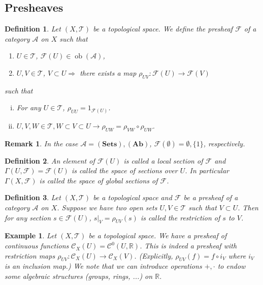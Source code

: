 \documentclass{article}
\newtheorem{definition}{Definition}[section]
\newtheorem{remark}{Remark}[section]
\newtheorem{example}{Example}[section]
\numberwithin{equation}{section}
\DeclareMathOperator{\ob}{ob}
\begin{document}
\subsection{Presheaves}

\begin{definition}
Let $(X,\mathcal{T})$ be a topological space. We define the presheaf $\mathcal{F}$ of a category $\mathcal{A}$ on $X$ such that 
\begin{enumerate}[\textbullet]
\item $U\in\mathcal{T}$, $\mathcal{F}(U)\in\ob(\mathcal{A})$,
\item $U,V\in\mathcal{T}$, $V\subset U \Rightarrow $ there exists a map $\rho_{UV}:\mathcal{F}(U)\to\mathcal{F}(V)$ 
\end{enumerate}

such that 
\begin{enumerate}[i).]
\item For any $U\in\mathcal{T}$, $\rho_{UU}=1_{\mathcal{F}(U)}$.
\item $U,V,W\in\mathcal{T}, W\subset V\subset U\rightarrow \rho_{UW}=\rho_{VW}\circ\rho_{UW}$.
\end{enumerate}
\end{definition}

\begin{remark}
In the case $\mathcal{A} = (\mathbf{Sets}),(\mathbf{Ab})$, $\mathcal{F}(\emptyset)=\emptyset,\{1\}$, respectively.
\end{remark}

\begin{definition}
An element of $\mathcal{F}(U)$ is called a local section of $\mathcal{F}$ and $\Gamma(U,\mathcal{F}) = \mathcal{F}(U)$ is called the space of sections over $U$. In particular $\Gamma(X,\mathcal{F})$ is called the space of global sections of $\mathcal{F}$.
\end{definition}

\begin{definition}
Let $(X,\mathcal{T})$ be a topological space and $\mathcal{F}$ be a presheaf of a category $\mathcal{A}$ on $X$. Suppose we have two open sets $U,V\in\mathcal{T}$ such that $V\subset U$. Then for any section $s\in\mathcal{F}(U)$, $s|_V=\rho_{UV}(s)$ is called the restriction of $s$ to $V$.
\end{definition}

\begin{example}
Let $(X,\mathcal{T})$ be a topological space. We have a presheaf of continuous functions $\mathcal{C}_X(U)=\mathcal{C}^0(U,\mathbb{R})$. This is indeed a presheaf with restriction maps $\rho_{UV}:\mathcal{C}_X(U)\to\mathcal{C}_X(V)$. (Explicitly, $\rho_{UV}(f) = f\circ i_V$ where $i_V$ is an inclusion map.)  We note that we can introduce operations $+,\cdot$ to endow some algebraic structures (groups, rings, ...) on $\mathbb{R}$.
\end{example}
\end{document}
